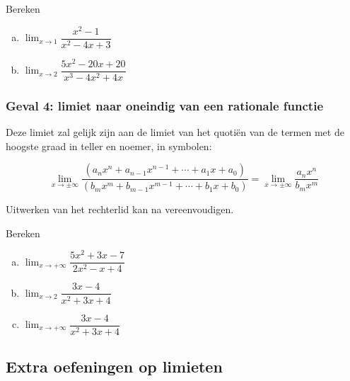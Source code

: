 \documentclass[12pt]{article}
\newenvironment{eigenschap}
{
  \vspace{0.4cm}
  \begin{mdframed}[nobreak=true,frametitle={Eigenschap}]
  }{%
  \end{mdframed}
}
\begin{document}
\begin{oefening}
  Bereken
  \begin{enumerate}[(a)]
  \itemsep.5em
  \item $\displaystyle\lim_{x\to1}\dfrac{x^2-1}{x^2-4x+3}$
  \item $\displaystyle\lim_{x\to2}\dfrac{5x^2-20x+20}{x^3-4x^2+4x}$
  \end{enumerate}
\end{oefening}

\begin{theorie}

\subsubsection*{Geval 4: limiet naar oneindig van een rationale functie}

Deze limiet zal gelijk zijn aan de limiet van het quotiën van de termen met de hoogste graad in teller en noemer, in symbolen:

\begin{eigenschap}
  $$\lim_{x\to \pm\infty}\dfrac{\left(a_nx^n+a_{n-1}x^{n-1}+\cdots+a_1x+a_0\right)}{\left(b_mx^m+b_{m-1}x^{m-1}+\cdots+b_1x+b_0\right)}=\lim_{x\to \pm\infty}\dfrac{a_nx^n}{b_mx^m}$$
\end{eigenschap}

Uitwerken van het rechterlid kan na vereenvoudigen.

\end{theorie}

\begin{oefening}
  Bereken
  \begin{enumerate}[(a)]
  \itemsep.5em
  \item $\displaystyle\lim_{x\to+\infty}\dfrac{5x^2+3x-7}{2x^2-x+4}$
  \item $\displaystyle\lim_{x\to2}\dfrac{3x-4}{x^2+3x+4}$
  \item $\displaystyle\lim_{x\to+\infty}\dfrac{3x-4}{x^2+3x+4}$
  \end{enumerate}
\end{oefening}

\begin{theorie}

\subsection{Extra oefeningen op limieten}

\end{theorie}
\end{document}
